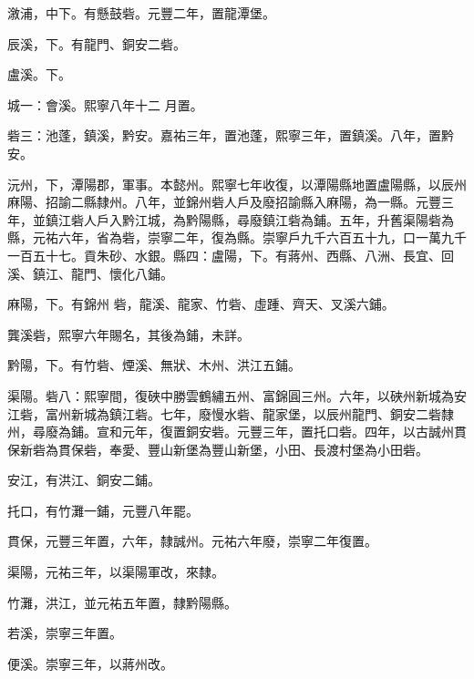 \begin{pinyinscope}
 漵浦，中下。有懸鼓砦。元豐二年，置龍潭堡。



 辰溪，下。有龍門、銅安二砦。



 盧溪。下。



 城一：會溪。熙寧八年十二
 月置。



 砦三：池蓬，鎮溪，黔安。嘉祐三年，置池蓬，熙寧三年，置鎮溪。八年，置黔安。



 沅州，下，潭陽郡，軍事。本懿州。熙寧七年收復，以潭陽縣地置盧陽縣，以辰州麻陽、招諭二縣隸州。八年，並錦州砦人戶及廢招諭縣入麻陽，為一縣。元豐三年，並鎮江砦人戶入黔江城，為黔陽縣，尋廢鎮江砦為鋪。五年，升舊渠陽砦為縣，元祐六年，省為砦，崇寧二年，復為縣。崇寧戶九千六百五十九，口一萬九千一百五十七。貢朱砂、水銀。縣四：盧陽，下。有蔣州、西縣、八洲、長宜、回溪、鎮江、龍門、懷化八鋪。



 麻陽，下。有錦州
 砦，龍溪、龍家、竹砦、虛踵、齊天、叉溪六鋪。



 龔溪砦，熙寧六年賜名，其後為鋪，未詳。



 黔陽，下。有竹砦、煙溪、無狀、木州、洪江五鋪。



 渠陽。砦八：熙寧間，復硤中勝雲鶴繡五州、富錦圓三州。六年，以硤州新城為安江砦，富州新城為鎮江砦。七年，廢慢水砦、龍家堡，以辰州龍門、銅安二砦隸州，尋廢為鋪。宣和元年，復置銅安砦。元豐三年，置托口砦。四年，以古誠州貫保新砦為貫保砦，奉愛、豐山新堡為豐山新堡，小田、長渡村堡為小田砦。



 安江，有洪江、銅安二鋪。



 托口，有竹灘一鋪，元豐八年罷。



 貫保，元豐三年置，六年，隸誠州。元祐六年廢，崇寧二年復置。



 渠陽，元祐三年，以渠陽軍改，來隸。



 竹灘，洪江，並元祐五年置，隸黔陽縣。



 若溪，崇寧三年置。



 便溪。崇寧三年，以蔣州改。




\end{pinyinscope}
